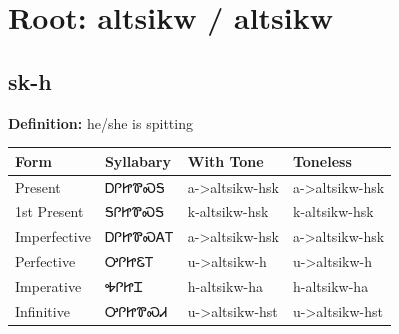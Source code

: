 \documentclass{article}%
\begin{document}
%
\normalsize%
\section*{Root: altsikw / altsikw}%
\subsection*{sk-h}%
\textbf{Definition: }%
he/she is spitting%
\\[0.5em]%
\begin{tabular}{|l|l|l|l|}%
\hline%
\textbf{Form}&\textbf{Syllabary}&\textbf{With Tone}&\textbf{Toneless}\\%
\hline%
Present&ᎠᎵᏥᏈᏍᎦ&a{-}>altsikw{-}hsk&a{-}>altsikw{-}hsk\\%
1st Present&ᎦᎵᏥᏈᏍᎦ&k{-}altsikw{-}hsk&k{-}altsikw{-}hsk\\%
Imperfective&ᎠᎵᏥᏈᏍᎪᎢ&a{-}>altsikw{-}hsk&a{-}>altsikw{-}hsk\\%
Perfective&ᎤᎵᏥᏋᎢ&u{-}>altsikw{-}h&u{-}>altsikw{-}h\\%
Imperative&ᎭᎵᏥᏆ&h{-}altsikw{-}ha&h{-}altsikw{-}ha\\%
Infinitive&ᎤᎵᏥᏈᏍᏗ&u{-}>altsikw{-}hst&u{-}>altsikw{-}hst\\%
\hline%
\end{tabular}%
\\[1em]%
\end{document}
